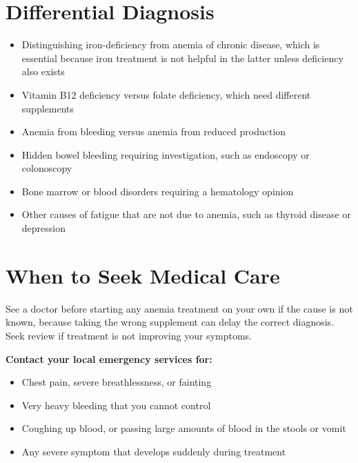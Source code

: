 \section*{Differential Diagnosis}
\begin{itemize}
    \item Distinguishing iron-deficiency from anemia of chronic disease, which is essential because iron treatment is not helpful in the latter unless deficiency also exists
    \item Vitamin B12 deficiency versus folate deficiency, which need different supplements
    \item Anemia from bleeding versus anemia from reduced production
    \item Hidden bowel bleeding requiring investigation, such as endoscopy or colonoscopy
    \item Bone marrow or blood disorders requiring a hematology opinion
    \item Other causes of fatigue that are not due to anemia, such as thyroid disease or depression
\end{itemize}

\section*{When to Seek Medical Care}
See a doctor before starting any anemia treatment on your own if the cause is not known, because taking the wrong supplement can delay the correct diagnosis. Seek review if treatment is not improving your symptoms.

\textbf{Contact your local emergency services for:}
\begin{itemize}
    \item Chest pain, severe breathlessness, or fainting
    \item Very heavy bleeding that you cannot control
    \item Coughing up blood, or passing large amounts of blood in the stools or vomit
    \item Any severe symptom that develops suddenly during treatment
\end{itemize}

